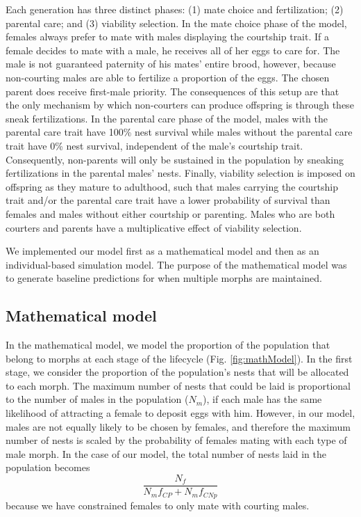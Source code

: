 \documentclass[
  11pt,
]{article}
\begin{document}
Each generation has three distinct phases: (1) mate choice and
fertilization; (2) parental care; and (3) viability selection. In the
mate choice phase of the model, females always prefer to mate with males
displaying the courtship trait. If a female decides to mate with a male,
he receives all of her eggs to care for. The male is not guaranteed
paternity of his mates' entire brood, however, because non-courting
males are able to fertilize a proportion of the eggs. The chosen parent
does receive first-male priority. The consequences of this setup are
that the only mechanism by which non-courters can produce offspring is
through these sneak fertilizations. In the parental care phase of the
model, males with the parental care trait have 100\% nest survival while
males without the parental care trait have 0\% nest survival, independent
of the male's courtship trait. Consequently, non-parents will only be
sustained in the population by sneaking fertilizations in the parental
males' nests. Finally, viability selection is imposed on offspring as
they mature to adulthood, such that males carrying the courtship trait
and/or the parental care trait have a lower probability of survival than
females and males without either courtship or parenting. Males who are
both courters and parents have a multiplicative effect of viability
selection.

We implemented our model first as a mathematical model and then as an
individual-based simulation model. The purpose of the mathematical model
was to generate baseline predictions for when multiple morphs are
maintained.

\hypertarget{mathematical-model}{%
\subsection{Mathematical model}\label{mathematical-model}}

In the mathematical model, we model the proportion of the population
that belong to morphs at each stage of the lifecycle (Fig.
\ref{fig:mathModel}). In the first stage, we consider the proportion of
the population's nests that will be allocated to each morph. The maximum
number of nests that could be laid is proportional to the number of
males in the population (\(N_m\)), if each male has the same likelihood of
attracting a female to deposit eggs with him. However, in our model,
males are not equally likely to be chosen by females, and therefore the
maximum number of nests is scaled by the probability of females mating
with each type of male morph. In the case of our model, the total number
of nests laid in the population becomes \[
\frac{N_f}{N_mf_{CP}+N_m f_{CNp}}
\] because we have constrained females to only mate with courting males.
\end{document}
